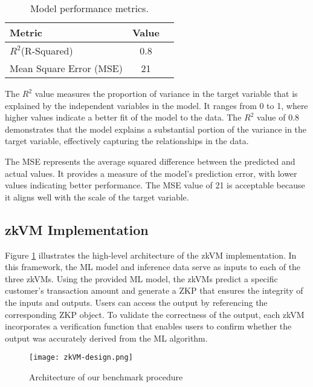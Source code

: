 \documentclass{scrartcl}
\begin{document}
\begin{table}[!ht]
\centering
\begin{tabular}{|l|c|p{8cm}|}
\hline
\textbf{Metric} & \textbf{Value} \\
\hline
\( R^2 \)(R-Squared) & 0.8  \\
\hline
Mean Square Error (MSE) & 21 \\
\hline
\end{tabular}
\caption{Model performance metrics.}
\label{tab:model-performance}
\end{table}

The \(R^2\) value measures the proportion of variance in the target variable that is explained by the independent variables in the model. It ranges from 0 to 1, where higher values indicate a better fit of the model to the data. The \(R^2\) value of 0.8 demonstrates that the model explains a substantial portion of the variance in the target variable, effectively capturing the relationships in the data.

The MSE represents the average squared difference between the predicted and actual values. It provides a measure of the model's prediction error, with lower values indicating better performance. The MSE value of 21 is acceptable because it aligns well with the scale of the target variable.

\subsection{zkVM Implementation}

Figure \ref{fig:architecture} illustrates the high-level architecture of the zkVM implementation. In this framework, the ML model and inference data serve as inputs to each of the three zkVMs. Using the provided ML model, the zkVMs predict a specific customer’s transaction amount and generate a ZKP that ensures the integrity of the inputs and outputs. Users can access the output by referencing the corresponding ZKP object. To validate the correctness of the output, each zkVM incorporates a verification function that enables users to confirm whether the output was accurately derived from the ML algorithm.

\begin{figure}[H]
	\begin{center}
		\texttt{[image: zkVM-design.png]}
	\end{center}
	\caption{Architecture of our benchmark procedure}
	\label{fig:architecture}
\end{figure}
\end{document}
